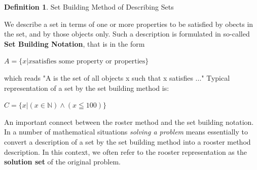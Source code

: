 \documentclass{book}
\theoremstyle{definition}
\newtheorem{definition}{Definition}[section]
\theoremstyle{remark}
\newcommand{\bb}[1]{\mathbb{#1}}
\begin{document}
\begin{definition}
Set Building Method of Describing Sets \\
    
    \begin{tcolorbox}
    We describe a set in terms of one or more properties to be satisfied by obects in the set, and by those objects only. Such a description is formulated in so-called {\bf Set Building Notation}, that is in the form 
    	\begin{center}
    		$A = \{ x | x \text{satisfies some property or properties} \}$
    	\end{center}
    which reads "A is the set of all objects x such that x satisfies ..." Typical representation of a set by the set building method is:
    	\begin{center}
    		$C = \{ x | (x \in \bb{N})\wedge(x \leqq 100) \}$
    	\end{center}	
    \end{tcolorbox}
    
    An important connect between the roster method and the set building notation. In a  number of mathematical situations {\it solving a problem} means essentially to convert a description of a set by the set building method into a rooster method description. In this context, we often refer to the rooster representation as the {\bf solution set} of the original problem.  
\end{definition}
\end{document}
